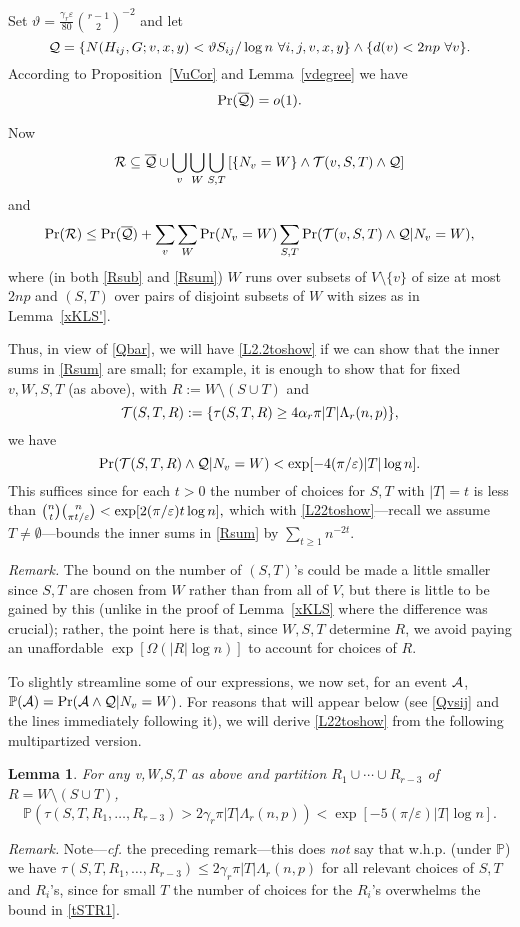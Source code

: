 \documentclass[letterpaper,11pt]{article}
\newtheorem{lemma}[thm]{Lemma}
\newcommand{\beq}[1]{\begin{equation}\label{#1}}
\newcommand{\enq}[0]{\end{equation}}
\newcommand{\mn}[0]{\medskip\noindent}
\newcommand{\sub}[0]{\subseteq}
\newcommand{\sm}[0]{\setminus}
\renewcommand{\dots}[0]{,\ldots,}
\newcommand{\ov}[0]{\overline}
\newcommand{\A}[0]{{\cal A}}
\newcommand{\Q}[0]{{\cal Q}}
\newcommand{\R}[0]{{\cal R}}
\newcommand{\T}[0]{{\cal T}}
\newcommand{\PPP}[0]{\mathbb P}
\newcommand{\0}[0]{\emptyset}
\newcommand{\C}[2]{{{#1}\choose{{#2}}}}
\newcommand{\Cc}[0]{\tbinom}
\newcommand{\ga}[0]{\alpha }
\newcommand{\gc}[0]{\gamma }
\newcommand{\gL}[0]{\Lambda}
\newcommand{\gO}[0]{\Omega}
\newcommand{\eps}[0]{\varepsilon }
\newcommand{\vt}[0]{\vartheta}
\begin{document}
Set $\vt = \frac{\gc_r\eps}{80}\C{r-1}{2}^{-2}$ and let
\[
\Q=
\{N(H_{ij},G;v,x,y) < \vt S_{ij}/\log n
~\forall i,j,v,x,y\}
\wedge \{d(v)< 2np ~\forall v\}.
\]
According to Proposition~\ref{VuCor}
and Lemma~\ref{vdegree} we have
\beq{Qbar}
\Pr(\ov{\Q})=o(1).
\enq

Now
\beq{Rsub}
\R\sub \ov{\Q}\cup\bigcup_v\bigcup_W\bigcup_{S,T}
\left[\{N_v=W\}\wedge \T(v,S,T)\wedge\Q\right]
\enq
and
\beq{Rsum}
\Pr(\R)\leq \Pr(\ov{\Q})+
\sum_v\sum_W\Pr(N_v=W)\sum_{S,T}
\Pr(\T(v,S,T)\wedge\Q|N_v=W),
\enq
where (in both \eqref{Rsub} and \eqref{Rsum})
$W$ runs over subsets of $ V\sm \{v\}$ of size at most $2np$
and $(S,T)$ over pairs of disjoint subsets of $W$ with
sizes as in Lemma~\ref{xKLS'}.


Thus, in view of \eqref{Qbar}, we will have \eqref{L2.2toshow}
if we can show that the inner sums in \eqref{Rsum} are small;
for example, it is enough to show that
for fixed $v,W,S,T$ (as above), with $R:=W\sm (S\cup T)$
and
\[
\T(S,T,R):=\{\tau(S,T,R)\geq 4\ga_r\pi |T| \gL_r(n,p)\},
\]
we have
\beq{L22toshow}
\Pr(\T(S,T,R)\wedge\Q|N_v=W)<  \exp[- 4(\pi/\eps) |T| \log n].
\enq
This suffices since for each $t>0$
the number of choices for $S,T$ with $|T|=t$
is less than
$\Cc{n}{t}\Cc{n}{\pi t/\eps} < \exp[2(\pi/\eps)t\log n ],
$
which with \eqref{L22toshow}---recall we assume
$T\neq \0$---bounds the inner sums in
\eqref{Rsum} by $\sum_{t\geq 1}n^{-2t}$.

\mn
{\em Remark.}  The bound on the number of
$(S,T)$'s could be made a little smaller
since $S,T$ are chosen from $W$ rather than from all of $V$, but
there is little to be gained by this
(unlike in the proof of Lemma~\ref{xKLS} where the difference
was crucial); rather, the point here
is that, since $W,S,T$ determine $R$, we avoid
paying an unaffordable $\exp[\gO(|R|\log n)]$
to account for choices of $R$.

\medskip
To slightly streamline some of our expressions, we
now set, for an event $\A$,
$\PPP(\A) =\Pr(\A\wedge \Q|N_v=W)$.
%
For reasons that will appear below
(see \eqref{Qvsij} and the lines immediately following it),
we will derive \eqref{L22toshow} from the
following multipartized version.
%
\begin{lemma}\label{Ri's}
For any v,W,S,T as above and partition
$R_1\cup\cdots\cup R_{r-3}$ of $R=W\sm (S\cup T)$,
\beq{tSTR1}
\mbox{$\PPP(\tau(S,T,R_1\dots R_{r-3}) > 2\gc_r\pi |T|\gL_r(n,p))
< \exp[-5 (\pi/\eps)|T|\log n].$}
\enq
\end{lemma}
\mn
{\em Remark.}  Note---{\em cf.} the preceding remark---this
does {\em not} say that w.h.p. (under $\PPP$) we have
$\tau(S,T,R_1\dots R_{r-3}) \leq 2\gc_r\pi |T| \gL_r(n,p)$
for all relevant choices of $S,T$ and $R_i$'s,
since for small $T$
the number of choices for the $R_i$'s
overwhelms the bound in \eqref{tSTR1}.
\end{document}
